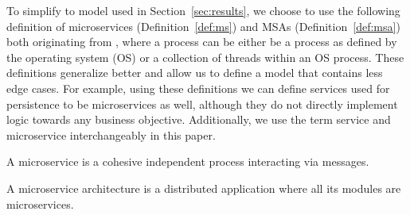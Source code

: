 To simplify to model used in Section~\ref{sec:results}, we choose to use the following definition of microservices (Definition~\ref{def:ms}) and MSAs (Definition~\ref{def:msa}) both originating from \cite{Garriga2018203}, where a process can be either be a process as defined by the operating system (OS) or a collection of threads within an OS process. These definitions generalize better and allow us to define a model that contains less edge cases. For example, using these definitions we can define services used for persistence to be microservices as well, although they do not directly implement logic towards any business objective. Additionally, we use the term service and microservice interchangeably in this paper.


\begin{definition}[Microservice, MS]\label{def:ms}
    A microservice is a cohesive independent process interacting via messages.
\end{definition}

\begin{definition}\label{def:msa}
    A microservice architecture is a distributed application where all its modules are microservices.
\end{definition}